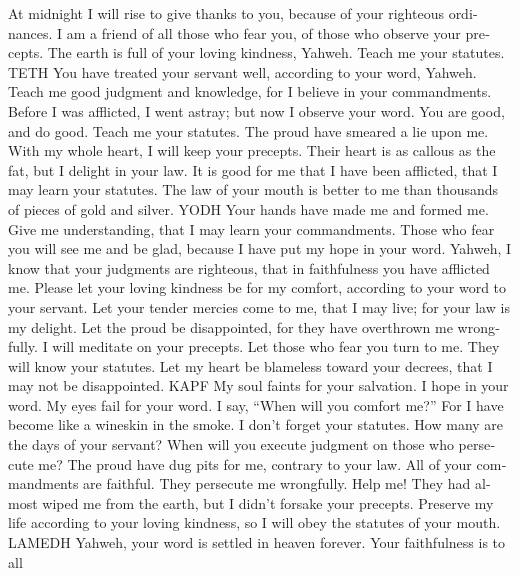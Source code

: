 \begin{paracol}{2}
\begin{otherlanguage}{english}
 At midnight I will rise to give thanks to you, because
of your righteous ordinances.  I am a friend of all those
who fear you, of those who observe your precepts.  The
earth is full of your loving kindness, Yahweh. Teach me your statutes.
TETH  You have treated your servant well, according to
your word, Yahweh.  Teach me good judgment and knowledge,
for I believe in your commandments.  Before I was
afflicted, I went astray; but now I observe your word. 
You are good, and do good. Teach me your statutes.  The
proud have smeared a lie upon me. With my whole heart, I will keep your
precepts.  Their heart is as callous as the fat, but I
delight in your law.  It is good for me that I have been
afflicted, that I may learn your statutes.  The law of
your mouth is better to me than thousands of pieces of gold and silver.
YODH  Your hands have made me and formed me. Give me
understanding, that I may learn your commandments.  Those
who fear you will see me and be glad, because I have put my hope in your
word.  Yahweh, I know that your judgments are righteous,
that in faithfulness you have afflicted me.  Please let
your loving kindness be for my comfort, according to your word to your
servant.  Let your tender mercies come to me, that I may
live; for your law is my delight.  Let the proud be
disappointed, for they have overthrown me wrongfully. I will meditate on
your precepts.  Let those who fear you turn to me. They
will know your statutes.  Let my heart be blameless
toward your decrees, that I may not be disappointed. KAPF
 My soul faints for your salvation. I hope in your word.
 My eyes fail for your word. I say, ``When will you
comfort me?''  For I have become like a wineskin in the
smoke. I don't forget your statutes.  How many are the
days of your servant? When will you execute judgment on those who
persecute me?  The proud have dug pits for me, contrary
to your law.  All of your commandments are faithful. They
persecute me wrongfully. Help me!  They had almost wiped
me from the earth, but I didn't forsake your precepts. 
Preserve my life according to your loving kindness, so I will obey the
statutes of your mouth. LAMEDH  Yahweh, your word is
settled in heaven forever.  Your faithfulness is to all

\end{otherlanguage}
\end{paracol}
